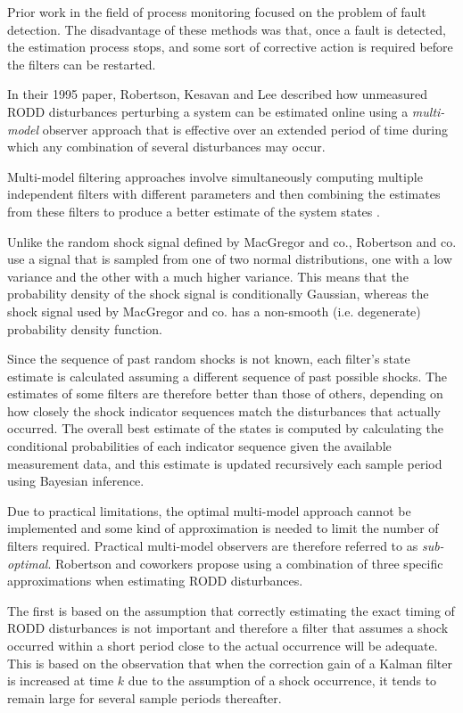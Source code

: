 Prior work in the field of process monitoring focused on the problem of fault detection. The disadvantage of these methods was that, once a fault is detected, the estimation process stops, and some sort of corrective action is required before the filters can be restarted. 

In their 1995 paper, Robertson, Kesavan and Lee \cite{robertson_detection_1995} described how unmeasured RODD disturbances perturbing a system can be estimated online using a \textit{multi-model} observer approach that is effective over an extended period of time during which any combination of several disturbances may occur.

Multi-model filtering approaches involve simultaneously computing multiple independent filters with different parameters and then combining the estimates from these filters to produce a better estimate of the system states \cite{jaffer_estimation_1971, buxbaum_recursive_1970, tugnait_detection_1982}.

Unlike the random shock signal defined by MacGregor and co., Robertson and co. use a signal that is sampled from one of two normal distributions, one with a low variance and the other with a much higher variance. This means that the probability density of the shock signal is conditionally Gaussian, whereas the shock signal used by MacGregor and co. has a non-smooth (i.e. degenerate) probability density function.

Since the sequence of past random shocks is not known, each filter's state estimate is calculated assuming a different sequence of past possible shocks. The estimates of some filters are therefore better than those of others, depending on how closely the shock indicator sequences match the disturbances that actually occurred. The overall best estimate of the states is computed by calculating the conditional probabilities of each indicator sequence given the available measurement data, and this estimate is updated recursively each sample period using Bayesian inference.

Due to practical limitations, the optimal multi-model approach cannot be implemented and some kind of approximation is needed to limit the number of filters required. Practical multi-model observers are therefore referred to as \textit{sub-optimal}. Robertson and coworkers propose using a combination of three specific approximations when estimating RODD disturbances.

The first is based on the assumption that correctly estimating the exact timing of RODD disturbances is not important and therefore a filter that assumes a shock occurred within a short period close to the actual occurrence will be adequate. This is based on the observation that when the correction gain of a Kalman filter is increased at time $k$ due to the assumption of a shock occurrence, it tends to remain large for several sample periods thereafter.

